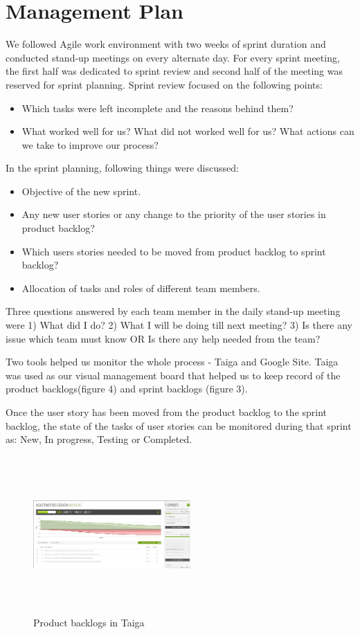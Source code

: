 \documentclass[11pt]{article}
\begin{document}
\section{Management Plan}
We followed Agile work environment with two weeks of sprint duration and conducted stand-up meetings on every alternate day. For every sprint meeting, the first half was dedicated to sprint review and second half of the meeting was reserved for sprint planning. Sprint review focused on the following points:
\begin{itemize}
\item Which tasks were left incomplete and the reasons behind them?
\item What worked well for us? What did not worked well for us? What actions can we take to improve our process?
\end{itemize}
In the sprint planning, following things were discussed:
\begin{itemize}
\item Objective of the new sprint.
\item Any new user stories or any change to the priority of the user stories in product backlog?
\item Which users stories needed to be moved from product backlog to sprint backlog?
\item Allocation of tasks and roles of different team members.
\end{itemize}

Three questions answered by each team member in the daily stand-up meeting were 1) What did I do? 2) What I will be doing till next meeting? 3) Is there any issue which team must know OR Is there any help needed from the team? 

Two tools helped us monitor the whole process - Taiga and Google Site. Taiga was used as our visual management board that helped us to keep record of the product backlogs(figure 4) and sprint backlogs (figure 3).

Once the user story has been moved from the product backlog to the sprint backlog, the state of the tasks of user stories can be monitored during that sprint as: New, In progress, Testing or Completed.

\begin{figure}[!ht]
\centering
\includegraphics[width=6cm, height=6cm]{Backlog.jpg}
\caption{Product backlogs in Taiga}
\end{figure}
\end{document}
